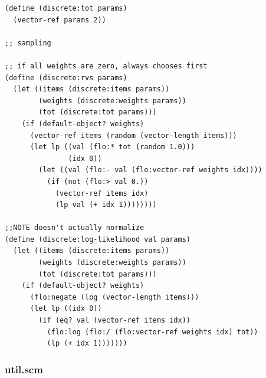 \documentclass{article}
\begin{document}
\begin{verbatim}
(define (discrete:tot params)
  (vector-ref params 2))

;; sampling

;; if all weights are zero, always chooses first
(define (discrete:rvs params)
  (let ((items (discrete:items params))
        (weights (discrete:weights params))
        (tot (discrete:tot params)))
    (if (default-object? weights)
      (vector-ref items (random (vector-length items)))
      (let lp ((val (flo:* tot (random 1.0)))
               (idx 0))
        (let ((val (flo:- val (flo:vector-ref weights idx))))
          (if (not (flo:> val 0.))
            (vector-ref items idx)
            (lp val (+ idx 1))))))))

;;NOTE doesn't actually normalize
(define (discrete:log-likelihood val params)
  (let ((items (discrete:items params))
        (weights (discrete:weights params))
        (tot (discrete:tot params)))
    (if (default-object? weights)
      (flo:negate (log (vector-length items)))
      (let lp ((idx 0))
        (if (eq? val (vector-ref items idx))
          (flo:log (flo:/ (flo:vector-ref weights idx) tot))
          (lp (+ idx 1)))))))
\end{verbatim}

\subsubsection{util.scm}
\end{document}
